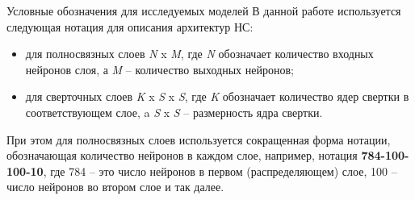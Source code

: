 \documentclass[10pt]{beamer}
\begin{document}
        \begin{frame}{Условные обозначения для исследуемых моделей}
            В данной работе используется следующая нотация для описания архитектур НС: 
            \begin{itemize}
                \item для полносвязных слоев \textit{N} x \textit{M}, где \textit{N} обозначает количество входных нейронов слоя, а \textit{M} -- количество выходных нейронов;  
                \item для сверточных слоев \textit{K} x \textit{S} x \textit{S}, где \textit{K} обозначает количество ядер свертки в соответствующем слое, a \textit{S} x \textit{S} -- размерность ядра свертки.
            \end{itemize}
            При этом для полносвязных слоев используется сокращенная форма нотации, обозначающая количество нейронов в каждом слое, например, нотация \textbf{784-100-100-10}, где 784 -- это число нейронов в первом (распределяющем) слое, 100 -- число нейронов во втором слое и так далее. 
        \end{frame}
\end{document}
